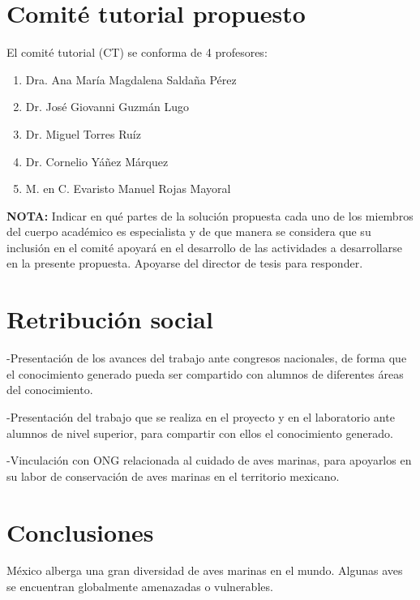 \documentclass[runningheads,a4paper]{llncs}
\begin{document}
\section{Comité tutorial propuesto}

El comité tutorial (CT) se conforma de 4 profesores:

\begin{enumerate}
\settowidth{\leftmargin}{{\Large$\circ$}}\advance\leftmargin{}
\itemsep8pt\relax \renewcommand{}
    \item Dra. Ana María Magdalena Saldaña Pérez
    \item Dr. José Giovanni Guzmán Lugo \\
    \item Dr. Miguel Torres Ruíz \\
    \item Dr. Cornelio Yáñez Márquez \\
    \item M. en C. Evaristo Manuel Rojas Mayoral
\end{enumerate}


\textbf{NOTA:} Indicar en qué partes de la solución propuesta cada uno de los
miembros del cuerpo académico es especialista y de que manera se considera que
su inclusión en el comité apoyará en el desarrollo de las actividades a
desarrollarse en la presente propuesta. Apoyarse del director de tesis para
responder.

\section{Retribución social}

-Presentación de los avances del trabajo ante congresos nacionales, de forma que
el conocimiento generado pueda ser compartido con alumnos de diferentes áreas
del conocimiento.

-Presentación del trabajo que se realiza en el proyecto y en el laboratorio ante
alumnos de nivel superior, para compartir con ellos el conocimiento generado.

-Vinculación con ONG relacionada al cuidado de aves marinas, para apoyarlos en
su labor de conservación de aves marinas en el territorio mexicano.

\section{Conclusiones}

México alberga una gran diversidad de aves marinas en el mundo. Algunas aves se
encuentran globalmente amenazadas o vulnerables. 
\end{document}
